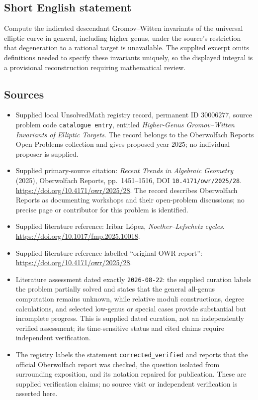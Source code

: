 \documentclass[11pt]{article}
\begin{document}
\subsection{Short English statement}
Compute the indicated descendant Gromov--Witten invariants of the universal elliptic curve in general, including higher genus, under the source's restriction that degeneration to a rational target is unavailable. The supplied excerpt omits definitions needed to specify these invariants uniquely, so the displayed integral is a provisional reconstruction requiring mathematical review.
\subsection{Sources}
\begin{itemize}
\item Supplied local UnsolvedMath registry record, permanent ID \(30006277\), source problem code \texttt{catalogue entry}, entitled \emph{Higher-Genus Gromov--Witten Invariants of Elliptic Targets}. The record belongs to the Oberwolfach Reports Open Problems collection and gives proposed year \(2025\); no individual proposer is supplied.
\item Supplied primary-source citation: \emph{Recent Trends in Algebraic Geometry} (2025), Oberwolfach Reports, pp.\ 1451--1516, DOI \texttt{10.4171/owr/2025/28}. \url{https://doi.org/10.4171/owr/2025/28}. The record describes Oberwolfach Reports as documenting workshops and their open-problem discussions; no precise page or contributor for this problem is identified.
\item Supplied literature reference: Iribar L\'opez, \emph{Noether--Lefschetz cycles}. \url{https://doi.org/10.1017/fmp.2025.10018}.
\item Supplied literature reference labelled ``original OWR report'': \url{https://doi.org/10.4171/owr/2025/28}.
\item Literature assessment dated exactly \texttt{2026-08-22}: the supplied curation labels the problem partially solved and states that the general all-genus computation remains unknown, while relative moduli constructions, degree calculations, and selected low-genus or special cases provide substantial but incomplete progress. This is supplied dated curation, not an independently verified assessment; its time-sensitive status and cited claims require independent verification.
\item The registry labels the statement \texttt{corrected\_verified} and reports that the official Oberwolfach report was checked, the question isolated from surrounding exposition, and its notation repaired for publication. These are supplied verification claims; no source visit or independent verification is asserted here.
\end{itemize}
\end{document}
